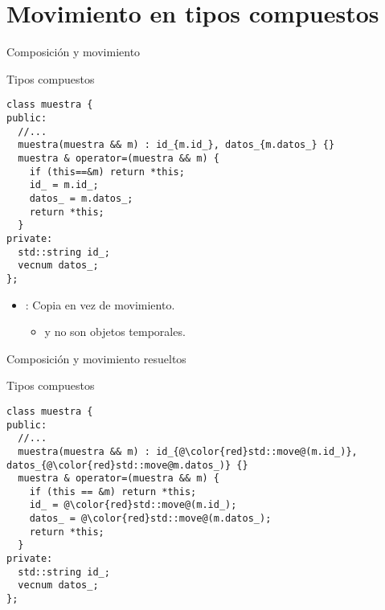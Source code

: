 \section{Movimiento en tipos compuestos}

\begin{frame}[t,fragile]{Composición y movimiento}
\begin{block}{Tipos compuestos}
\begin{lstlisting}
class muestra {
public:
  //...
  muestra(muestra && m) : id_{m.id_}, datos_{m.datos_} {}
  muestra & operator=(muestra && m) {
    if (this==&m) return *this;
    id_ = m.id_;
    datos_ = m.datos_;
    return *this;
  }
private:
  std::string id_;
  vecnum datos_;
};
\end{lstlisting}
\end{block}

\begin{itemize}
  \item {}: Copia en vez de movimiento.
    \begin{itemize}
      \pause
      \item {} y  no son objetos temporales.
    \end{itemize}
\end{itemize}

\end{frame}


\begin{frame}[t,fragile]{Composición y movimiento resueltos}
\begin{block}{Tipos compuestos}
\begin{lstlisting}[escapechar=@]
class muestra {
public:
  //...
  muestra(muestra && m) : id_{@\color{red}std::move@(m.id_)}, datos_{@\color{red}std::move@m.datos_)} {}
  muestra & operator=(muestra && m) {
    if (this == &m) return *this;
    id_ = @\color{red}std::move@(m.id_);
    datos_ = @\color{red}std::move@(m.datos_);
    return *this;
  }
private:
  std::string id_;
  vecnum datos_;
};
\end{lstlisting}
\end{block}

\end{frame}


